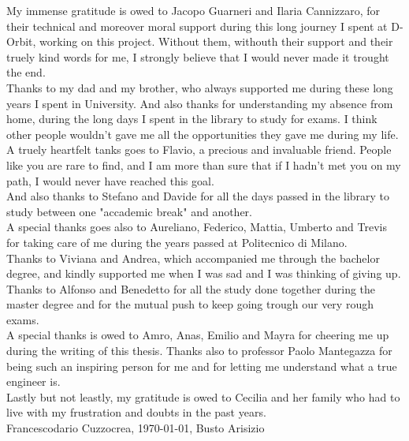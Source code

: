 My immense gratitude is owed to Jacopo Guarneri and Ilaria Cannizzaro, for their technical and moreover moral support during this long journey I spent at D-Orbit, working on this project. Without them, withouth their support and their truely kind words for me, I strongly believe that I would never made it trought the end.\\
Thanks to my dad and my brother, who always supported me during these long years I spent in University. And also thanks for understanding my absence from home, during the long days I spent in the library to study for exams. I think other people wouldn't gave me all the opportunities they gave me during my life.\\
A truely heartfelt tanks goes to Flavio, a precious and invaluable friend. People like you are rare to find, and I am more than sure that if I hadn't met you on my path, I would never have reached this goal.\\
And also thanks to Stefano and Davide for all the days passed in the library to study between one "accademic break" and another.\\
A special thanks goes also to Aureliano, Federico, Mattia, Umberto and Trevis for taking care of me during the years passed at Politecnico di Milano.\\
Thanks to Viviana and Andrea, which accompanied me through the bachelor degree, and kindly supported me when I was sad and I was thinking of giving up.\\
Thanks to Alfonso and Benedetto for all the study done together during the master degree and for the mutual push to keep going trough our very rough exams.\\
A special thanks is owed to Amro, Anas, Emilio and Mayra for cheering me up during the writing of this thesis.
Thanks also to professor Paolo Mantegazza for being such an inspiring person for me and for letting me understand what a true engineer is.\\
Lastly but not leastly, my gratitude is owed to Cecilia and her family who had to live with my frustration and doubts in the past years.\\

Francescodario Cuzzocrea, \today, Busto Arisizio
